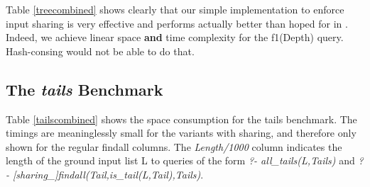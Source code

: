 \documentclass{tlp}
\begin{document}
Table \ref{treecombined} shows clearly that our simple implementation
to enforce input sharing is very effective and performs actually
better than hoped for in \cite{OKeefePearl}. Indeed, we achieve linear
space {\bf and} time complexity for the f1(Depth) query. Hash-consing
would not be able to do that.




\subsection{The {\em tails} Benchmark}\label{tailsbenchmark}

Table \ref{tailscombined} shows the space consumption for the tails
benchmark. The timings are meaninglessly small for the variants with
sharing, and therefore only shown for the regular findall columns. The
{\em Length/1000} column indicates the length of the ground input list
L to queries of the form {\em ?- all\_tails(L,Tails)} and {\em ?-
  [sharing\_]findall(Tail,is\_tail(L,Tail),Tails)}.
\end{document}
